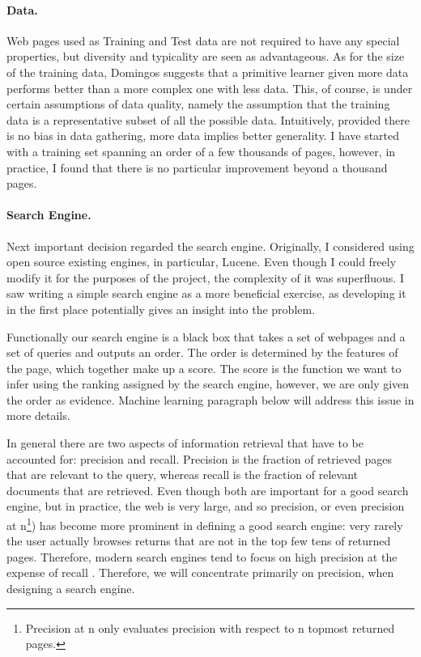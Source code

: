 \documentclass[12pt,twoside,notitlepage]{report}
\begin{document}
\paragraph{Data.}

Web pages used as Training and Test data are not required to have any special
properties, but diversity and typicality are seen as advantageous. As for the
size of the training data, Domingos \cite{domingos} suggests that a primitive
learner given more data performs better than a more complex one with less data.
This, of course, is under certain assumptions of data quality, namely the
assumption that the training data is a representative subset of all the
possible data. Intuitively, provided there is no bias in data gathering, more
data implies better generality. I have started with a training set spanning an
order of a few thousands of pages, however, in practice, I found that there is
no particular improvement beyond a thousand pages. 

\paragraph{Search Engine.}

Next important decision regarded the search engine.  Originally, I considered
using open source existing engines, in particular, Lucene. Even though I could
freely modify it for the purposes of the project, the complexity of it was
superfluous. I saw writing a simple search engine as a more beneficial
exercise, as developing it in the first place potentially gives an insight into
the problem.

Functionally our search engine is a black box that takes a set of webpages and
a set of queries and outputs an order. The order is determined by the features
of the page, which together make up a score. The score is the
function we want to infer using the ranking assigned by the search engine,
however, we are only given the order as evidence. Machine learning paragraph
below will address this issue in more details.

In general there are two aspects of information retrieval that have to be
accounted for: precision and recall. Precision is the fraction of retrieved pages that
are relevant to the query, whereas recall is the fraction of relevant
documents that are retrieved. Even though both are important for a good search
engine, but in practice, the web is very large, and so precision, or even
precision at n\footnote{Precision at n only evaluates precision with respect to
n topmost returned pages.}) has become
more prominent in defining a good search engine: very rarely the user actually
browses returns that are not in the top few tens of returned pages. Therefore, 
modern search engines tend to focus on high precision at the expense of recall
\cite{GOOGLE}. Therefore, we will concentrate primarily on precision, when
designing a search engine.
\end{document}
